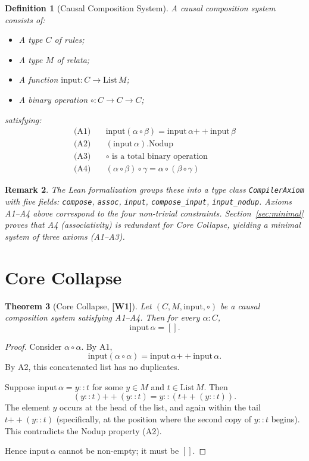 ﻿\documentclass[11pt]{article}
\newcommand{\wone}[1]{\textcolor{wcolor}{\textbf{[#1]}}}
\newtheorem{theorem}{Theorem}
\newtheorem{definition}[theorem]{Definition}
\newtheorem{remark}[theorem]{Remark}
\begin{document}
\begin{definition}[Causal Composition System]
\label{def:system}
A \emph{causal composition system} consists of:
\begin{itemize}
\item A type $C$ of \emph{rules};
\item A type $M$ of \emph{relata};
\item A function $\mathrm{input} : C \to \mathrm{List}\,M$;
\item A binary operation $\circ : C \to C \to C$;
\end{itemize}
satisfying:
\begin{align}
\text{(A1)}\quad & \mathrm{input}(\alpha \circ \beta)
  = \mathrm{input}\,\alpha \mathbin{+\!+}
    \mathrm{input}\,\beta
  \label{ax:additive}\\
\text{(A2)}\quad & (\mathrm{input}\,\alpha).\mathrm{Nodup}
  \label{ax:nodup}\\
\text{(A3)}\quad & \circ \text{ is a total binary operation}
  \label{ax:compose}\\
\text{(A4)}\quad & (\alpha \circ \beta) \circ \gamma
  = \alpha \circ (\beta \circ \gamma)
  \label{ax:assoc}
\end{align}
\end{definition}

\begin{remark}
The Lean formalization groups these into a type class
\texttt{CompilerAxiom} with five fields:
\texttt{compose}, \texttt{assoc}, \texttt{input},
\texttt{compose\_input}, \texttt{input\_nodup}.
Axioms A1--A4 above correspond to the four non-trivial
constraints. Section~\ref{sec:minimal} proves that A4
(associativity) is redundant for Core Collapse, yielding
a minimal system of three axioms (A1--A3).
\end{remark}

\section{Core Collapse}
\label{sec:core}

\begin{theorem}[Core Collapse, \wone{W1}]
\label{thm:core}
Let $(C, M, \mathrm{input}, \circ)$ be a causal composition
system satisfying A1--A4. Then for every $\alpha : C$,
\[
\mathrm{input}\,\alpha = [].
\]
\end{theorem}

\begin{proof}
Consider $\alpha \circ \alpha$. By A1,
\[
\mathrm{input}(\alpha \circ \alpha)
  = \mathrm{input}\,\alpha \mathbin{+\!+}
    \mathrm{input}\,\alpha.
\]
By A2, this concatenated list has no duplicates.

Suppose $\mathrm{input}\,\alpha = y :: t$ for some $y \in M$
and $t \in \mathrm{List}\,M$. Then
\[
(y :: t) \mathbin{+\!+} (y :: t)
  = y :: (t \mathbin{+\!+} (y :: t)).
\]
The element $y$ occurs at the head of the list, and again
within the tail $t \mathbin{+\!+} (y :: t)$ (specifically,
at the position where the second copy of $y :: t$ begins).
This contradicts the Nodup property (A2).

Hence $\mathrm{input}\,\alpha$ cannot be non-empty; it must
be $[]$.
\end{proof}
\end{document}
